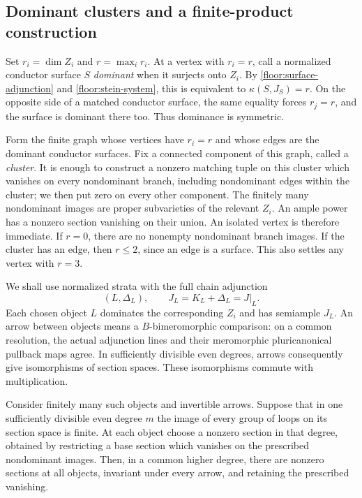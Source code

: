 \subsection{Dominant clusters and a finite-product construction}

Set $r_i=\dim Z_i$ and $r=\max_i r_i$.  At a vertex with $r_i=r$,
call a normalized conductor surface $S$ \emph{dominant} when it
surjects onto $Z_i$.  By \eqref{floor:surface-adjunction} and
\eqref{floor:stein-system}, this is equivalent to
$\kappa(S,J_S)=r$.  On the opposite side of a matched conductor
surface, the same equality forces $r_j=r$, and the surface is
dominant there too.  Thus dominance is symmetric.

Form the finite graph whose vertices have $r_i=r$ and whose edges
are the dominant conductor surfaces.  Fix a connected component
of this graph, called a \emph{cluster}.  It is enough to construct a
nonzero matching tuple on this cluster which vanishes on every
nondominant branch, including nondominant edges within the cluster;
we then put zero on every other component.  The finitely many
nondominant images are proper subvarieties of the relevant $Z_i$.
An ample power has a nonzero section vanishing on their union.
An isolated vertex is therefore immediate.  If $r=0$, there are no
nonempty nondominant branch images.  If the cluster has an edge,
then $r\le2$, since an edge is a surface.  This also settles any
vertex with $r=3$.

We shall use normalized strata with the full chain adjunction
\[
 (L,\Delta_L),\qquad J_L=K_L+\Delta_L=J|_L.
\]
Each chosen object $L$ dominates the corresponding $Z_i$ and has
semiample $J_L$.  An arrow between objects means a $B$-bimeromorphic
comparison: on a common resolution, the actual adjunction lines and
their meromorphic pluricanonical pullback maps agree.  In sufficiently
divisible even degrees, arrows consequently give isomorphisms of
section spaces.  These isomorphisms commute with multiplication.

\begin{lemma}
\label{floor:products}
Consider finitely many such objects and invertible arrows.  Suppose
that in one sufficiently divisible even degree $m$ the image of
every group of loops on its section space is finite.  At each object
choose a nonzero section in that degree, obtained by restricting a
base section which vanishes on the prescribed nondominant images.
Then, in a common higher degree, there are nonzero sections at all
objects, invariant under every arrow, and retaining the prescribed
vanishing.
\end{lemma}

